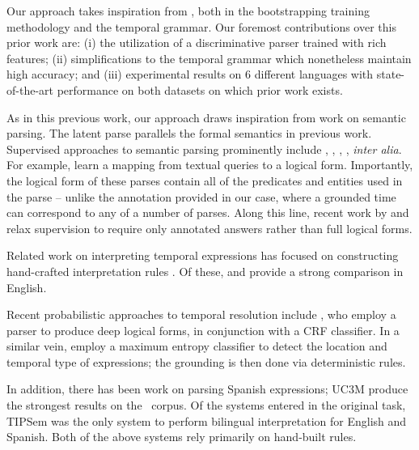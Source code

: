 Our approach takes inspiration from \me, both in the bootstrapping training
  methodology and the temporal grammar.
Our foremost contributions over this prior work are:
  (i) the utilization of a discriminative parser trained with rich features;
  (ii) simplifications to the temporal grammar which nonetheless maintain
       high accuracy;
  and
  (iii) experimental results on 6 different languages with state-of-the-art
        performance on both datasets on which prior work exists.

As in this previous work,
  our approach draws inspiration from work on semantic parsing.
The latent parse parallels the formal semantics in previous work.
Supervised approaches to semantic parsing prominently include
	,
	,
	, 
	, 
	\textit{inter alia}.
For example,  learn a mapping from
	textual queries to a logical form.
Importantly, the logical form of these parses contain all of the predicates
  and entities used in the parse -- unlike the annotation provided in our case,
  where a grounded time can correspond to any of a number of parses.
Along this line, recent work by  and 
	 relax supervision 
	to require only annotated answers rather than full logical forms.

Related work on interpreting temporal expressions has focused on constructing
	hand-crafted interpretation rules
	\cite{key:2000mani-temporal,key:2003saquete-temporal,key:2004puscasu-temporal,key:2010grover-temporal}.  
Of these,  \cite{key:2010strotgen-temporal} and
	 \cite{key:2012chang-temporal} provide a strong
	comparison in English.

Recent probabilistic approaches to temporal resolution include
	,    %
	who employ a parser to produce deep logical forms, in conjunction with
	a CRF classifier.
In a similar vein,
	employ a maximum entropy classifier to detect the location and temporal
	type of expressions; the grounding is then done via deterministic rules.
	
In addition, there has been work on parsing Spanish expressions;
  UC3M \cite{2010vicente-uc3m} produce the strongest results on the
  \tempeval\ corpus.
Of the systems entered in the original task,
  TIPSem \cite{key:2010llorens-tipsem} was the only system to perform bilingual
  interpretation for English and Spanish.
Both of the above systems rely primarily on hand-built rules.



